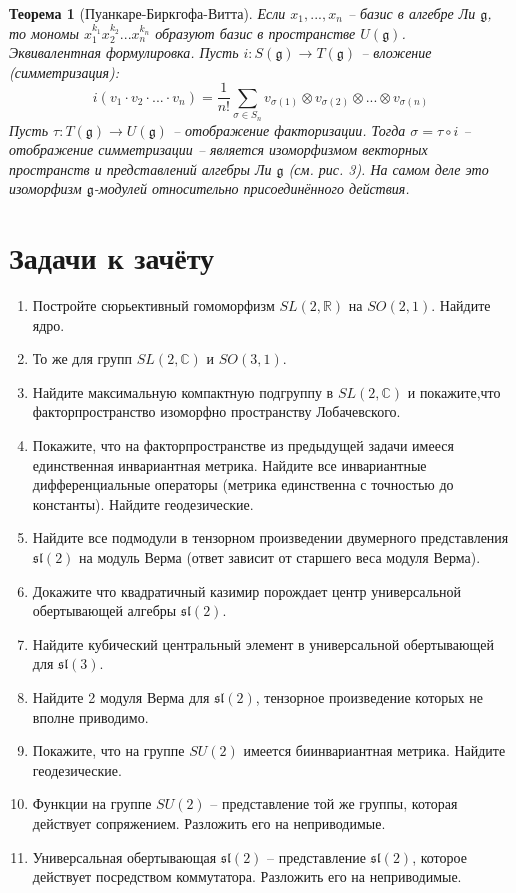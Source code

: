 \documentclass[12pt]{article}
\newtheorem{theorem}{Теорема}
\theoremstyle{definition}
\begin{document}
\begin{theorem}[Пуанкаре-Биркгофа-Витта]
Если $x_1,...,x_n$ -- базис в алгебре Ли $\mathfrak{g}$, то мономы $x_1^{k_1}x_2^{k_2}...x_n^{k_n}$ образуют базис в пространстве $U(\mathfrak{g})$.\\
Эквивалентная формулировка. Пусть $i:S(\mathfrak{g})\rightarrow T(\mathfrak{g})$ -- вложение (симметризация):
\begin{equation}
    i(v_1\cdot v_2\cdot...\cdot v_n)=\frac{1}{n!}\sum\limits_{\sigma\in S_n}v_{\sigma(1)}\otimes v_{\sigma(2)}\otimes...\otimes v_{\sigma(n)}
\end{equation}
Пусть $\tau:T(\mathfrak{g})\rightarrow U(\mathfrak{g})$ -- отображение факторизации. Тогда $\sigma=\tau\circ i$ -- отображение симметризации -- является изоморфизмом векторных пространств и представлений алгебры Ли $\mathfrak{g}$ (см. рис. 3). На самом деле это изоморфизм $\mathfrak{g}$-модулей относительно присоединённого действия.
\end{theorem}
\section{Задачи к зачёту}
\begin{enumerate}
    \item Постройте сюрьективный гомоморфизм $SL(2,\mathbb{R})$ на $SO(2,1)$. Найдите ядро.
    \item То же для групп $SL(2,\mathbb{C})$ и $SO(3,1)$.
    \item Найдите максимальную компактную подгруппу в $SL(2, \mathbb{C})$ и покажите,что факторпространство изоморфно пространству Лобачевского.
    \item Покажите, что на факторпространстве из предыдущей задачи имееся единственная инвариантная метрика. Найдите все инвариантные дифференциальные операторы (метрика единственна с точностью до константы). Найдите геодезические.
    \item Найдите все подмодули в тензорном произведении двумерного представления $\mathfrak{sl}(2)$ на модуль Верма (ответ зависит от старшего веса модуля Верма).
    \item Докажите что квадратичный казимир порождает центр универсальной обертывающей алгебры $\mathfrak{sl}(2)$.
    \item Найдите кубический центральный элемент в универсальной обертывающей для $\mathfrak{sl}(3)$.
    \item Найдите 2 модуля Верма для $\mathfrak{sl}(2)$, тензорное произведение которых не вполне приводимо.
    \item Покажите, что на группе $SU(2)$ имеется биинвариантная метрика. Найдите геодезические.
    \item Функции на группе $SU(2)$ -- представление той же группы, которая действует сопряжением. Разложить его на неприводимые.
    \item Универсальная обертывающая $\mathfrak{sl}(2)$ -- представление $\mathfrak{sl}(2)$, которое действует посредством коммутатора. Разложить его на неприводимые.
\end{enumerate}
\end{document}
